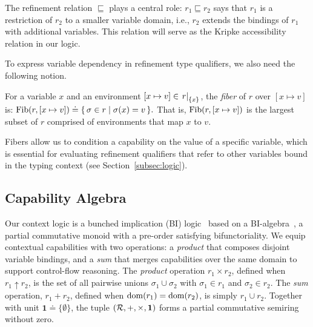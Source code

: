  The refinement relation
$\sqsubseteq$ plays a central role: $r_1 \sqsubseteq r_2$ says that
$r_1$ is a restriction of $r_2$ to a smaller variable domain, i.e.,
$r_2$ extends the bindings of $r_1$ with additional variables.  This
relation will serve as the Kripke accessibility relation in our logic.

To express variable dependency in refinement type qualifiers, we also
need the following notion.

\begin{definition}[Fiber] %
  \label{def:fibers}
  For a variable $x$ and an environment $[x \mapsto v] \in
  \left.{r}\right|_{\{x\}}$, the \emph{fiber} of $r$ over $[x \mapsto
  v]$ is:
  $
    \operatorname{Fib}(r,[x \mapsto v]) \doteq \{\, \sigma \in r \mid
    \sigma(x) = v \,\}.
  $
  That is, $\operatorname{Fib}(r,[x \mapsto v])$ is the largest subset of $r$
  comprised of environments that map $x$ to $v$.
\end{definition}
\noindent Fibers allow us to condition a capability on the value of a
specific variable, which is essential for evaluating refinement
qualifiers that refer to other variables bound in the typing context
(see Section~\ref{subsec:logic}).

\subsection{Capability Algebra} %
\label{subsec:algebra}

Our context logic is a bunched implication (BI) logic~\cite{OHP99}
based on a BI-algebra~\cite{Pym+02}, a partial commutative monoid with
a pre-order satisfying bifunctoriality.  We equip contextual
capabilities with two operations: a \emph{product} that composes
disjoint variable bindings, and a \emph{sum} that merges capabilities
over the same domain to support control-flow reasoning. The
\emph{product} operation $r_1 \times r_2$, defined when
$r_1 \uparrow r_2$, is the set of all pairwise unions
$\sigma_1 \cup \sigma_2$ with $\sigma_1 \in r_1$ and
$\sigma_2 \in r_2$.
The \emph{sum} operation, $r_1 + r_2$, defined when
$\mathrm{dom}(r_1) = \mathrm{dom}(r_2)$, is simply $r_1 \cup r_2$. Together with unit
$\mathbf{1} \doteq \{\emptyset\}$, the tuple
$(\mathcal{R}, +, \times, \mathbf{1})$ forms a partial commutative semiring
without zero.

